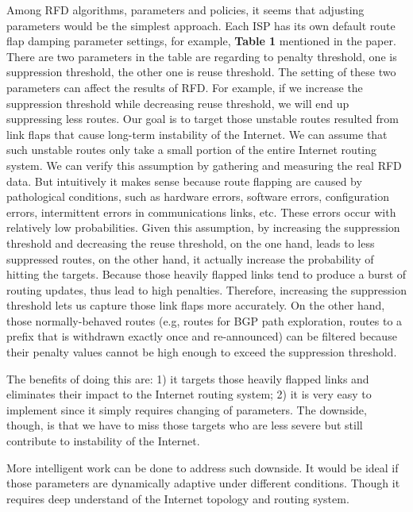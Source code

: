 \documentclass[11pt]{article}
\begin{document}
\vspace{1em}
Among RFD algorithms, parameters and policies, it seems that
adjusting parameters would be the simplest approach.
Each ISP has its own default route flap damping parameter settings,
for example, \textbf{Table 1} mentioned in the paper. There are two
parameters in the table are regarding to penalty threshold, one is
suppression threshold, the other one is reuse threshold. The setting
of these two parameters can affect the results of RFD. For example, if
we increase the suppression threshold while decreasing reuse
threshold, we will end up suppressing less routes. Our goal
is to target those unstable routes resulted from link flaps that cause
long-term instability of the Internet. We can assume that such
unstable routes only take a small portion of the entire Internet
routing system. We can verify this assumption by gathering and
measuring the real RFD data. But intuitively it makes sense because
route flapping are caused by pathological conditions, such as hardware
errors, software errors, configuration errors, intermittent errors in
communications links, etc. These errors occur with relatively low
probabilities. Given this assumption, by increasing the suppression
threshold and decreasing the reuse threshold, on the one hand, leads
to less suppressed routes, on the other hand, it actually increase the
probability of hitting the targets. Because those heavily flapped
links tend to produce a burst of routing updates, thus lead to high
penalties. Therefore, increasing the suppression threshold lets us
capture those link flaps more accurately. On the other hand, those
normally-behaved routes (e.g, routes for BGP path exploration, routes
to a prefix that is withdrawn exactly once and re-announced) can be
filtered because their penalty values cannot be high enough to exceed
the suppression threshold. 

\vspace{1em}
The benefits of doing this are: 1) it targets those
heavily flapped links and eliminates their impact to the Internet
routing system; 2) it is very easy to implement since it simply
requires changing of parameters. The downside, though, is that we have
to miss those targets who are less severe but still contribute to
instability of the Internet.

\vspace{1em}
More intelligent work can be done to address such downside. It would
be ideal if those parameters are dynamically adaptive under different
conditions. Though it requires deep understand of the Internet topology
and routing system. 
\end{document}
